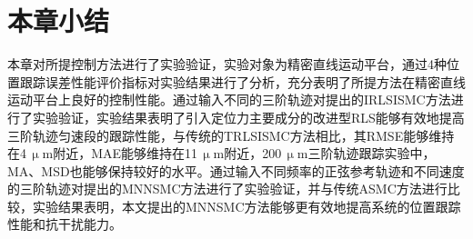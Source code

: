 \section{本章小结}
本章对所提控制方法进行了实验验证，实验对象为精密直线运动平台，通过4种位置跟踪误差性能评价指标对实验结果进行了分析，充分表明了所提方法在精密直线运动平台上良好的控制性能。通过输入不同的三阶轨迹对提出的IRLSISMC方法进行了实验验证，实验结果表明了引入定位力主要成分的改进型RLS能够有效地提高三阶轨迹匀速段的跟踪性能，与传统的TRLSISMC方法相比，其RMSE能够维持在4\,$\upmu$m附近，MAE能够维持在11\,$\upmu$m附近，200\,$\upmu$m三阶轨迹跟踪实验中，MA、MSD也能够保持较好的水平。通过输入不同频率的正弦参考轨迹和不同速度的三阶轨迹对提出的MNNSMC方法进行了实验验证，并与传统ASMC方法进行比较，实验结果表明，本文提出的MNNSMC方法能够更有效地提高系统的位置跟踪性能和抗干扰能力。
